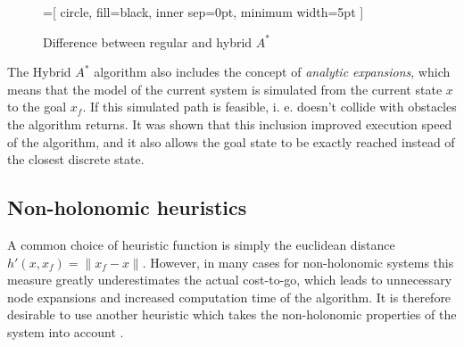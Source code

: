 \begin{figure}
    \begin{center}
        =[
            circle,
            fill=black,
            inner sep=0pt,
            minimum width=5pt
        ]
    \end{center}
    \caption{Difference between regular and hybrid $A^*$}
    \label{fig:hybrid_vs_regular}
\end{figure}

The Hybrid $A^*$ algorithm also includes the concept of \textit{analytic expansions}, which means that the
model of the current system is simulated from the current state $x$ to the goal $x_f$. If this simulated path is feasible,
i. e. doesn't collide with obstacles the algorithm returns. It was shown that this inclusion improved execution speed of the algorithm,
and it also allows the goal state to be exactly reached instead of the closest discrete state.

\subsection{Non-holonomic heuristics}
A common choice of heuristic function is simply the euclidean distance $h'(x, x_f)=\|x_f-x\|$. However, in many cases for
non-holonomic systems this measure greatly underestimates the actual cost-to-go, which leads to unnecessary node expansions and 
increased computation time of the algorithm. It is therefore desirable to use another heuristic which takes the non-holonomic properties 
of the system into account \cite{state_lattice_planning}.
